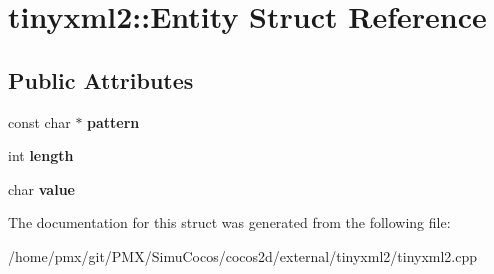 \hypertarget{structtinyxml2_1_1Entity}{}\section{tinyxml2\+:\+:Entity Struct Reference}
\label{structtinyxml2_1_1Entity}
\subsection*{Public Attributes}
\begin{DoxyCompactItemize}
\item 
\mbox{\label{structtinyxml2_1_1Entity_a9b3ad58242779fc20181e612b7c46cce}} 
const char $\ast$ {\bfseries pattern}
\item 
\mbox{\label{structtinyxml2_1_1Entity_a25e2b57cb59cb4fa68f283d7cb570f21}} 
int {\bfseries length}
\item 
\mbox{\label{structtinyxml2_1_1Entity_a7334e81e33b4615655a403711b24f3ed}} 
char {\bfseries value}
\end{DoxyCompactItemize}


The documentation for this struct was generated from the following file\+:\begin{DoxyCompactItemize}
\item 
/home/pmx/git/\+P\+M\+X/\+Simu\+Cocos/cocos2d/external/tinyxml2/tinyxml2.\+cpp\end{DoxyCompactItemize}
